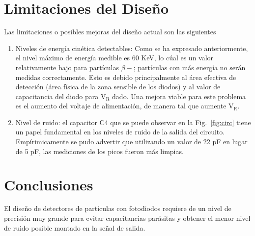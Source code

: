 \documentclass[a4paper,conference]{IEEEtran}
\begin{document}
\section{Limitaciones del Diseño}
    Las limitaciones o posibles mejoras del diseño actual son las siguientes
    \begin{enumerate}
        \item Niveles de energía cinética detectables: Como se ha expresado
            anteriormente, el nivel máximo de energía medible es 60 KeV, lo cúal
            es un valor relativamente bajo para partículas $\beta-$; partículas
            con más energía no serán medidas correctamente. Esto es debido
            principalmente al área efectiva de detección (área física de la zona
            sensible de los diodos) y al valor de capacitancia del diodo para
            $\mathrm{V_{R}}$ dado. Una mejora viable para este problema es el
            aumento del voltaje de alimentación, de manera tal que aumente
            $\mathrm{V_{R}}$.

        \item Nivel de ruido: el capacitor C4 que se puede observar en la
            Fig.~\ref{fig:circ} tiene un papel fundamental en los niveles de
            ruido de la salida del circuito. Empírimicamente se pudo advertir
            que utilizando un valor de 22 pF en lugar de 5 pF, las mediciones  
            de los picos fueron más limpias.
    \end{enumerate}

\section{Conclusiones}
    El diseño de detectores de partículas con fotodiodos requiere de un nivel de
    precisión muy grande para evitar capacitancias parásitas y obtener el menor
    nivel de ruido posible montado en la señal de salida.


\nocite{*}
\end{document}

